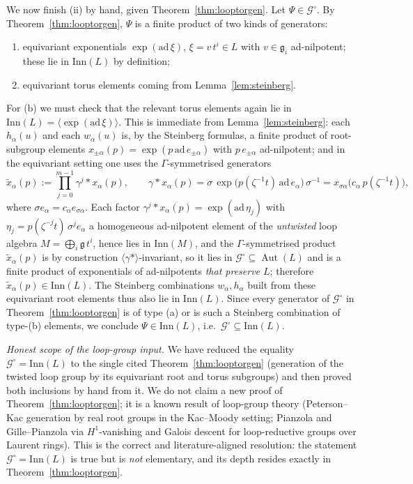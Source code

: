 \documentclass{amsart}
\theoremstyle{definition}
\DeclareMathOperator{\Aut}{Aut}
\newcommand{\g}{\mathfrak{g}}
\newcommand{\M}{M}
\begin{document}
We now finish (ii) by hand, given Theorem~\ref{thm:looptorgen}.  Let
$\Psi\in\mathcal G^\circ$.  By Theorem~\ref{thm:looptorgen}, $\Psi$ is a
finite product of two kinds of generators:
\begin{enumerate}
\item[(a)] equivariant exponentials $\exp(\mathrm{ad}\,\xi)$,
$\xi=v\,t^i\in L$ with $v\in\g_{\bar i}$ ad-nilpotent; these lie in
$\mathrm{Inn}(L)$ by definition;
\item[(b)] equivariant torus elements coming from Lemma~\ref{lem:steinberg}.
\end{enumerate}
For (b) we must check that the relevant torus elements again lie in
$\mathrm{Inn}(L)=\langle\exp(\mathrm{ad}\,\xi)\rangle$.  This is immediate
from Lemma~\ref{lem:steinberg}: each $h_\alpha(u)$ and each $w_\alpha(u)$ is,
by the Steinberg formulas, a finite product of root-subgroup elements
$x_{\pm\alpha}(p)=\exp(p\,\mathrm{ad}\,e_{\pm\alpha})$ with $p\,e_{\pm\alpha}$
ad-nilpotent; and in the equivariant setting one uses the
$\Gamma$-symmetrised generators
\[
\widetilde x_\alpha(p):=\prod_{j=0}^{m-1}\gamma^{j}\!*\!x_\alpha(p),
\qquad
\gamma\!*\!x_\alpha(p)
=\sigma\,\exp\!\bigl(p(\zeta^{-1}t)\,\mathrm{ad}\,e_\alpha\bigr)\,\sigma^{-1}
=x_{\sigma\alpha}\bigl(c_\alpha\,p(\zeta^{-1}t)\bigr),
\]
where $\sigma e_\alpha=c_\alpha e_{\sigma\alpha}$.  Each factor
$\gamma^{j}\!*\!x_\alpha(p)=\exp(\mathrm{ad}\,\eta_j)$ with $\eta_j=
p(\zeta^{-j}t)\,\sigma^{j}e_\alpha$ a homogeneous ad-nilpotent element of the
\emph{untwisted} loop algebra $\M=\bigoplus_i\g\,t^i$, hence lies in
$\mathrm{Inn}(\M)$, and the $\Gamma$-symmetrised product $\widetilde
x_\alpha(p)$ is by construction $\langle\gamma*\rangle$-invariant, so it lies
in $\mathcal G^\circ\subseteq\Aut(L)$ and is a finite product of
exponentials of ad-nilpotents \emph{that preserve $L$}; therefore
$\widetilde x_\alpha(p)\in\mathrm{Inn}(L)$.  The Steinberg combinations
$w_\alpha,h_\alpha$ built from these equivariant root elements thus also lie
in $\mathrm{Inn}(L)$.  Since every generator of $\mathcal G^\circ$ in
Theorem~\ref{thm:looptorgen} is of type (a) or is such a Steinberg
combination of type-(b) elements, we conclude $\Psi\in\mathrm{Inn}(L)$, i.e.\
$\mathcal G^\circ\subseteq\mathrm{Inn}(L)$.

\medskip
\noindent\emph{Honest scope of the loop-group input.}  We have reduced the equality
$\mathcal G^\circ=\mathrm{Inn}(L)$ to the single cited
Theorem~\ref{thm:looptorgen} (generation of the twisted loop group by its
equivariant root and torus subgroups) and then proved both inclusions by
hand from it.  We do not claim a new proof of
Theorem~\ref{thm:looptorgen}; it is a known result of loop-group theory
(Peterson--Kac generation by real root groups in the Kac--Moody setting;
Pianzola and Gille--Pianzola via $H^1$-vanishing and Galois descent for
loop-reductive groups over Laurent rings).  This is the correct and
literature-aligned resolution: the statement $\mathcal G^\circ=\mathrm{Inn}(L)$
is true but is \emph{not} elementary, and its depth resides exactly in
Theorem~\ref{thm:looptorgen}.
\end{document}
